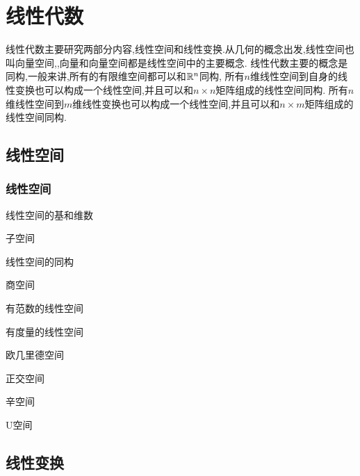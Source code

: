 \section{线性代数}

线性代数主要研究两部分内容,线性空间和线性变换.从几何的概念出发,线性空间也叫向量空间,,向量和向量空间都是线性空间中的主要概念.
线性代数主要的概念是同构,一般来讲,所有的有限维空间都可以和$\mathbb{R}^n$同构,
所有$n$维线性空间到自身的线性变换也可以构成一个线性空间,并且可以和$n \times n$矩阵组成的线性空间同构.
所有$n$维线性空间到$m$维线性变换也可以构成一个线性空间,并且可以和$n \times m$矩阵组成的线性空间同构.

\subsection{线性空间}

\subsubsection{线性空间}

\begin{defination}[线性空间]

\end{defination}

\begin{defination}[向量]

\end{defination}
\begin{defination}[线性子空间]

\end{defination}

线性空间的基和维数

子空间

线性空间的同构

商空间

有范数的线性空间

有度量的线性空间


欧几里德空间

正交空间

辛空间

U空间






\subsection{线性变换}
\begin{defination}[线性变换]

\end{defination}

